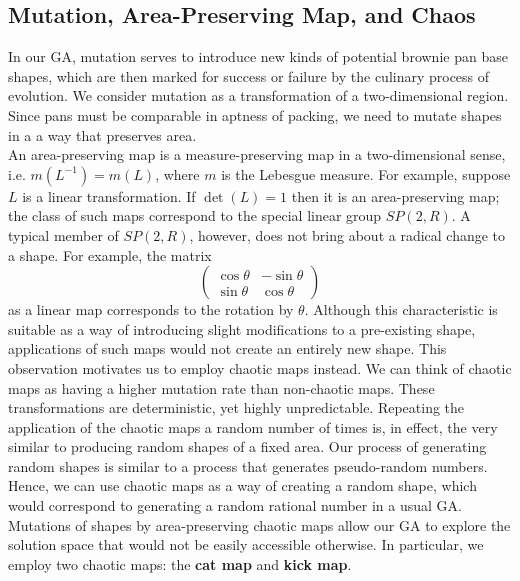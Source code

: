 \documentclass[12pt,draft]{reedmcm}
\begin{document}
\subsection{Mutation, Area-Preserving Map, and Chaos}
In our GA, mutation serves to introduce new kinds of potential brownie pan base shapes, which are then marked for success or failure by the culinary process of evolution.
We consider mutation as a transformation of a two-dimensional region.
Since pans must be comparable in aptness of packing, we need to mutate shapes in a a way that preserves area.\\
An area-preserving map is a measure-preserving map in a two-dimensional sense, i.e. $m(L^{-1}) = m(L)$, where $m$ is the Lebesgue measure.
For example, suppose $L$ is a linear transformation.
If $\det(L) = 1$ then it is an area-preserving map; the class of such maps correspond to the special linear group $SP(2,R)$.
A typical member of $SP(2,R)$, however, does not bring about a radical change to a shape.
For example, the matrix
\begin{equation*}
\begin{pmatrix}
    \cos\theta & -\sin\theta  \\
    \sin\theta & \cos\theta  
  \end{pmatrix}
\end{equation*}
as a linear map corresponds to the rotation by $\theta$. 
Although this characteristic is suitable as a way of introducing slight modifications to a pre-existing shape, applications of such maps would not create an entirely new shape.
This observation motivates us to employ chaotic maps instead.
We can think of chaotic maps as having a higher mutation rate than non-chaotic maps.
These transformations are deterministic, yet highly unpredictable.
Repeating the application of the chaotic maps a random number of times is, in effect, the very similar to producing random shapes of a fixed area. 
Our process of generating random shapes is similar to a process that generates pseudo-random numbers.
Hence, we can use chaotic maps as a way of creating a random shape, which would correspond to generating a random rational number in a usual GA.
Mutations of shapes by area-preserving chaotic maps allow our GA to explore the solution space that would not be easily accessible otherwise.
In particular, we employ two chaotic maps: the \textbf{cat map} and \textbf{kick map}.
\end{document}
